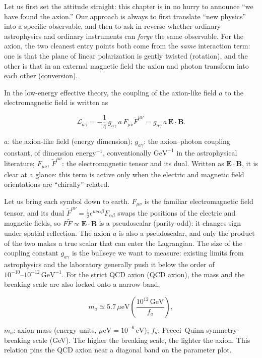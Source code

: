 Let us first set the attitude straight: this chapter is in no hurry to announce ``we have found the axion.'' Our approach is always to first translate ``new physics'' into a specific observable, and then to ask in reverse whether ordinary astrophysics and ordinary instruments can \emph{forge} the same observable. For the axion, the two cleanest entry points both come from the \emph{same} interaction term: one is that the plane of linear polarization is gently twisted (rotation), and the other is that in an external magnetic field the axion and photon transform into each other (conversion).

In the low-energy effective theory, the coupling of the axion-like field \(a\) to the electromagnetic field is written as

\begin{equation}
  \mathcal L_{a\gamma}
  = -\frac{1}{4}\,g_{a\gamma}\,a\,F_{\mu\nu}\tilde F^{\mu\nu}
  = g_{a\gamma}\,a\,\bm E\cdot\bm B .
  \label{eq:e22-lagrangian}
\end{equation}
\begin{formulaexplain}
\(a\): the axion-like field (energy dimension); \(g_{a\gamma}\): the axion--photon coupling constant, of dimension \(\mathrm{energy^{-1}}\), conventionally \(\mathrm{GeV^{-1}}\) in the astrophysical literature; \(F_{\mu\nu}\), \(\tilde F^{\mu\nu}\): the electromagnetic tensor and its dual. Written as \(\bm E\cdot\bm B\), it is clear at a glance: this term is active only when the electric and magnetic field orientations are ``chirally'' related.
\end{formulaexplain}

Let us bring each symbol down to earth. \(F_{\mu\nu}\) is the familiar electromagnetic field tensor, and its dual \(\tilde F^{\mu\nu}=\tfrac12\epsilon^{\mu\nu\alpha\beta}F_{\alpha\beta}\) swaps the positions of the electric and magnetic fields, so \(F\tilde F\propto \bm E\cdot\bm B\) is a pseudoscalar (parity-odd): it changes sign under spatial reflection. The axion \(a\) is also a pseudoscalar, and only the product of the two makes a true scalar that can enter the Lagrangian. The size of the coupling constant \(g_{a\gamma}\) is the bullseye we want to measure: existing limits from astrophysics and the laboratory generally push it below the order of \(10^{-10}\text{--}10^{-12}\,\mathrm{GeV^{-1}}\). For the strict QCD axion (QCD axion), the mass and the breaking scale are also locked onto a narrow band,

\begin{equation}
  m_a \simeq 5.7\,\mu\mathrm{eV}\left(\frac{10^{12}\,\mathrm{GeV}}{f_a}\right),
  \label{eq:e22-qcd-mass}
\end{equation}
\begin{formulaexplain}
\(m_a\): axion mass (energy units, \(\mu\mathrm{eV}=10^{-6}\,\mathrm{eV}\)); \(f_a\): Peccei--Quinn symmetry-breaking scale (GeV). The higher the breaking scale, the lighter the axion. This relation pins the QCD axion near a diagonal band on the parameter plot.
\end{formulaexplain}

